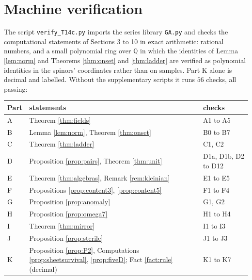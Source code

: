 \documentclass[11pt]{article}
\theoremstyle{definition}
\newcommand{\file}[1]{\texttt{#1}}
\begin{document}
\section{Machine verification}\label{sec:verification}

The script \file{verify\_T14c.py} \cite{ButlerVerifyT14c} imports the series library \file{GA.py} and checks the computational statements of Sections 3 to 10 in exact arithmetic: rational numbers, and a small polynomial ring over $\mathbb{Q}$ in which the identities of Lemma \ref{lem:norm} and Theorems \ref{thm:onset} and \ref{thm:ladder} are verified as polynomial identities in the spinors' coordinates rather than on samples. Part K alone is decimal and labelled. Without the supplementary scripts it runs $56$ checks, all passing:

\begin{center}\small
\begin{tabular}{@{}lll@{}}
\toprule
Part & statements & checks \\
\midrule
A & Theorem \ref{thm:fields} & A1 to A5 \\
B & Lemma \ref{lem:norm}, Theorem \ref{thm:onset} & B0 to B7 \\
C & Theorem \ref{thm:ladder} & C1, C2 \\
D & Proposition \ref{prop:pairs}, Theorem \ref{thm:unit} & D1a, D1b, D2 to D12 \\
E & Theorem \ref{thm:algebras}, Remark \ref{rem:kleinian} & E1 to E5 \\
F & Propositions \ref{prop:content3}, \ref{prop:content5} & F1 to F4 \\
G & Proposition \ref{prop:anomaly} & G1, G2 \\
H & Proposition \ref{prop:omega7} & H1 to H4 \\
I & Theorem \ref{thm:mirror} & I1 to I3 \\
J & Proposition \ref{prop:sterile} & J1 to J3 \\
K & Proposition \ref{prop:P2}, Computations \ref{prop:sheetsurvival}, \ref{prop:fiveD}; Fact \ref{fact:rule} (decimal) & K1 to K7 \\
\bottomrule
\end{tabular}
\end{center}
\end{document}
